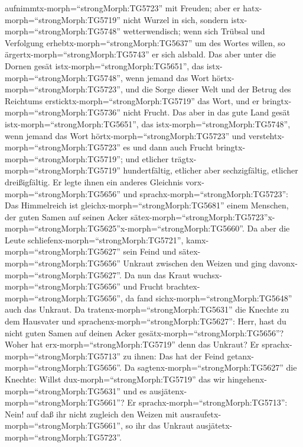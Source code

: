 aufnimmtx-morph=``strongMorph:TG5723'' mit Freuden;  aber
er hatx-morph=``strongMorph:TG5719'' nicht Wurzel in sich, sondern
istx-morph=``strongMorph:TG5748'' wetterwendisch; wenn sich Trübsal und
Verfolgung erhebtx-morph=``strongMorph:TG5637'' um des Wortes willen, so
ärgertx-morph=``strongMorph:TG5743'' er sich alsbald.  Das
aber unter die Dornen gesät istx-morph=``strongMorph:TG5651'', das
istx-morph=``strongMorph:TG5748'', wenn jemand das Wort
hörtx-morph=``strongMorph:TG5723'', und die Sorge dieser Welt und der
Betrug des Reichtums ersticktx-morph=``strongMorph:TG5719'' das Wort,
und er bringtx-morph=``strongMorph:TG5736'' nicht Frucht. 
Das aber in das gute Land gesät istx-morph=``strongMorph:TG5651'', das
istx-morph=``strongMorph:TG5748'', wenn jemand das Wort
hörtx-morph=``strongMorph:TG5723'' und
verstehtx-morph=``strongMorph:TG5723'' es und dann auch Frucht
bringtx-morph=``strongMorph:TG5719''; und etlicher
trägtx-morph=``strongMorph:TG5719'' hundertfältig, etlicher aber
sechzigfältig, etlicher dreißigfältig.  Er legte ihnen ein
anderes Gleichnis vorx-morph=``strongMorph:TG5656'' und
sprachx-morph=``strongMorph:TG5723'': Das Himmelreich ist
gleichx-morph=``strongMorph:TG5681'' einem Menschen, der guten Samen auf
seinen Acker
sätex-morph=``strongMorph:TG5723''\textbar x-morph=``strongMorph:TG5625''x-morph=``strongMorph:TG5660''.
 Da aber die Leute schliefenx-morph=``strongMorph:TG5721'',
kamx-morph=``strongMorph:TG5627'' sein Feind und
sätex-morph=``strongMorph:TG5656'' Unkraut zwischen den Weizen und ging
davonx-morph=``strongMorph:TG5627''.  Da nun das Kraut
wuchsx-morph=``strongMorph:TG5656'' und Frucht
brachtex-morph=``strongMorph:TG5656'', da fand
sichx-morph=``strongMorph:TG5648'' auch das Unkraut.  Da
tratenx-morph=``strongMorph:TG5631'' die Knechte zu dem Hausvater und
sprachenx-morph=``strongMorph:TG5627'': Herr, hast du nicht guten Samen
auf deinen Acker gesätx-morph=``strongMorph:TG5656''? Woher hat
erx-morph=``strongMorph:TG5719'' denn das Unkraut?  Er
sprachx-morph=``strongMorph:TG5713'' zu ihnen: Das hat der Feind
getanx-morph=``strongMorph:TG5656''. Da
sagtenx-morph=``strongMorph:TG5627'' die Knechte: Willst
dux-morph=``strongMorph:TG5719'' das wir
hingehenx-morph=``strongMorph:TG5631'' und es
ausjätenx-morph=``strongMorph:TG5661''?  Er
sprachx-morph=``strongMorph:TG5713'': Nein! auf daß ihr nicht zugleich
den Weizen mit ausraufetx-morph=``strongMorph:TG5661'', so ihr das
Unkraut ausjätetx-morph=``strongMorph:TG5723''. 
